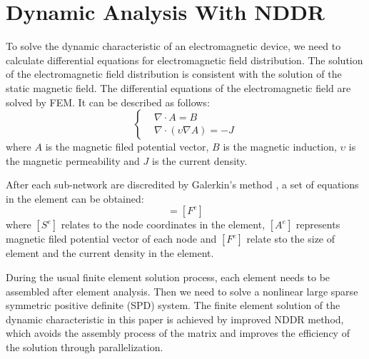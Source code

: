 \documentclass[journal,transmag]{IEEEtran}
\begin{document}
\section{Dynamic Analysis With NDDR}
To solve the dynamic characteristic of an electromagnetic device, we need to calculate differential equations for electromagnetic field distribution. The solution of the electromagnetic field distribution is consistent with the solution of the static magnetic field. The differential equations of the electromagnetic field are solved by FEM. It can be described as follows:
\begin{equation}
\left\{
\begin{aligned}
&{\nabla\cdot}A=B\\
&\nabla\cdot({\upsilon\nabla}A)=-J
\end{aligned}
\right.
\end{equation}
where $A$ is the magnetic filed potential vector, $B$ is the magnetic induction, $\upsilon$ is the magnetic permeability and $J$ is the current density. 

After each sub-network are discredited by Galerkin's method \cite{IEEEhowto:Rao}, a set of equations in the element can be obtained:
\begin{equation}
[S^e][A^e]=[F^e]
\end{equation}
where $[S^e]$ relates to the node coordinates in the element, $[A^e]$ represents magnetic filed potential vector of each node and $[F^e]$ relate sto the size of element and the current density in the element.

During the usual finite element solution process, each element needs to be assembled after element analysis. Then we need to solve a nonlinear large sparse symmetric positive definite (SPD) system. The finite element solution of the dynamic characteristic in this paper is achieved by improved NDDR method, which avoids the assembly process of the matrix and improves the efficiency of the solution through parallelization.
\end{document}
